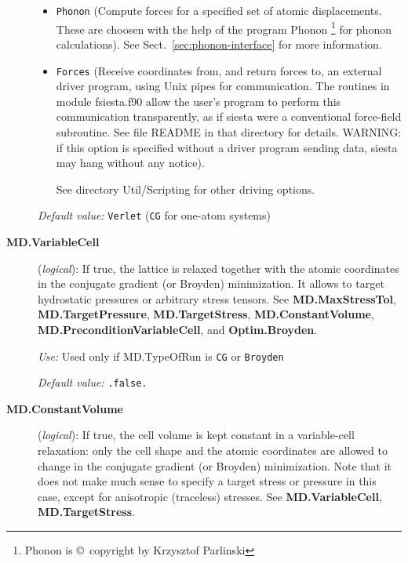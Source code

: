 \documentclass[11pt]{article}
\begin{document}
\begin{description}
\begin{itemize}
\item {\tt Phonon} (Compute forces for a specified set of atomic
displacements. These are choosen with the help of the program {\sc
Phonon} \footnote{{\sc Phonon} is \copyright\ copyright by Krzysztof
Parlinski}    for phonon calculations). See
Sect.~\ref{sec:phonon-interface} for more information.

\item {\tt Forces} (Receive coordinates from, and return forces to,
an external driver program, using Unix pipes for communication.
The routines in module fsiesta.f90 allow the
user's program to perform this communication transparently, as if
siesta were a conventional force-field subroutine. See file README
in that directory for details. WARNING: if this option is specified
without a driver program sending data, siesta may hang without
any notice).

See directory Util/Scripting  for other driving options.

\end{itemize}
    
{\it Default value:} {\tt Verlet} ({\tt CG} for one-atom systems)


\item[{\bf MD.VariableCell}] ({\it logical}):
 
If true, the lattice is relaxed together with the atomic coordinates
in the conjugate gradient (or Broyden) minimization. It allows to target
hydrostatic pressures or arbitrary stress tensors.  See {\bf
MD.MaxStressTol}, {\bf MD.TargetPressure}, {\bf MD.TargetStress}, {\bf
  MD.ConstantVolume}, {\bf MD.PreconditionVariableCell}, and {\bf Optim.Broyden}.

{\it Use:} Used only if MD.TypeOfRun is {\tt CG} or {\tt Broyden}

{\it Default value:} {\tt .false.}

\item[{\bf MD.ConstantVolume}] ({\it logical}):
If true, the cell volume is kept constant in a variable-cell
relaxation: only the cell shape and the atomic coordinates are allowed
to change in the conjugate gradient (or Broyden) minimization. 
Note that it does not make much sense to specify a target stress or
pressure in this case, except for anisotropic (traceless) stresses.
See {\bf MD.VariableCell}, {\bf MD.TargetStress}.


\end{description}
\end{document}

